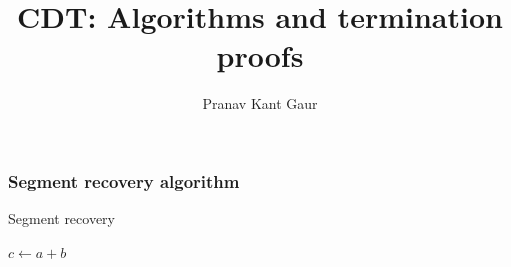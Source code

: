 \documentclass{beamer}
\title[CDT]{CDT: Algorithms and termination proofs}
\author{Pranav Kant Gaur}
\institute[BARC, India]{Computer Division, \newline Bhabha Atomic Research Centre, Mumbai, India}
\date{}
\begin{document}
\begin{frame}
  \titlepage
\end{frame}

\begin{frame}
\frametitle{Segment recovery algorithm}
\begin{algorithm}[H]
\caption{Segment recovery}\label{euclid}
\begin{algorithmic}[1]
	\State $c \gets a + b$
\EndProcedure
\end{algorithmic}
\end{algorithm}
\end{frame}
\end{document}
